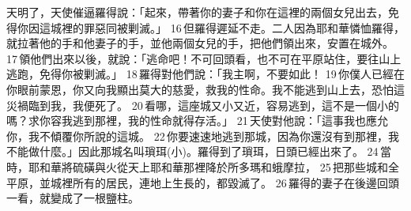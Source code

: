 天明了，天使催逼羅得說：「起來，帶著你的妻子和你在這裡的兩個女兒出去，免得你因這城裡的罪惡同被剿滅。」 16 但羅得遲延不走。二人因為耶和華憐恤羅得，就拉著他的手和他妻子的手，並他兩個女兒的手，把他們領出來，安置在城外。 17 領他們出來以後，就說：「逃命吧！不可回頭看，也不可在平原站住，要往山上逃跑，免得你被剿滅。」 18 羅得對他們說：「我主啊，不要如此！ 19 你僕人已經在你眼前蒙恩，你又向我顯出莫大的慈愛，救我的性命。我不能逃到山上去，恐怕這災禍臨到我，我便死了。 20 看哪，這座城又小又近，容易逃到，這不是一個小的嗎？求你容我逃到那裡，我的性命就得存活。」 21 天使對他說：「這事我也應允你，我不傾覆你所說的這城。 22 你要速速地逃到那城，因為你還沒有到那裡，我不能做什麼。」因此那城名叫瑣珥(小)。羅得到了瑣珥，日頭已經出來了。 24 當時，耶和華將硫磺與火從天上耶和華那裡降於所多瑪和蛾摩拉， 25 把那些城和全平原，並城裡所有的居民，連地上生長的，都毀滅了。 26 羅得的妻子在後邊回頭一看，就變成了一根鹽柱。

